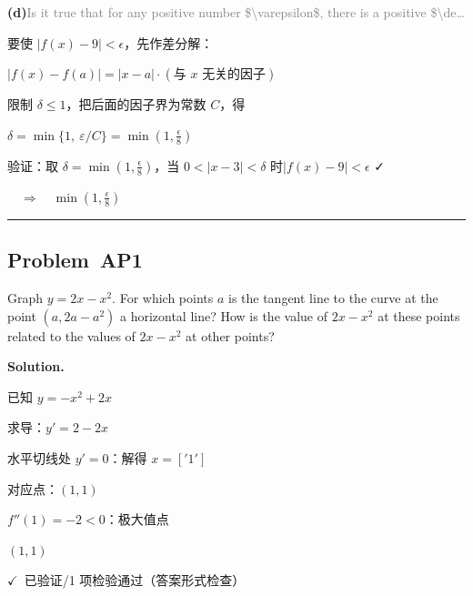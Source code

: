 \documentclass[12pt, a4paper]{article}
\newcommand{\problem}[1]{\subsection*{Problem~#1}}
\newcommand{\solution}{%
  \par\noindent
  {\color{solutiongreen}\bfseries Solution.}\par
}
\newcommand{\verifyok}{\textcolor{solutiongreen}{\ensuremath{\checkmark}\ 已验证}}
\begin{document}
\textbf{(d)}\quad \textcolor{gray}{\small Is it true that for any positive number \$\textbackslash{}varepsilon\$, there is a positive \$\textbackslash{}de…}

要使 $|f(x) - 9| < \epsilon$，先作差分解：

$|f(x)-f(a)| = |x-a|\cdot(\text{与 }x\text{ 无关的因子})$

限制 $\delta\le 1$，把后面的因子界为常数 $C$，得

$\delta = \min\{1,\ \varepsilon/C\} = \min\left(1, \frac{\epsilon}{8}\right)$

验证：取 $\delta = \min\left(1, \frac{\epsilon}{8}\right)$，当 $0<|x - 3| < \delta$ 时$|f(x) - 9| < \epsilon$ ✓

$\quad\Rightarrow\quad \min\left(1, \frac{\epsilon}{8}\right)$


\vspace{0.8em}\hrule\vspace{0.8em}

\problem{AP1}

\begin{stepbox}
Graph $y = 2x - x^2$. For which points $a$ is the tangent line to the curve at the point $(a, 2a - a^2)$ a horizontal line? How is the value of $2x - x^2$ at these points related to the values of $2x - x^2$ at other points?
\end{stepbox}

\solution

\begin{stepbox}
已知 $y = - x^{2} + 2 x$
\end{stepbox}

\begin{stepbox}
求导：$y' = 2 - 2 x$
\end{stepbox}

\begin{stepbox}
水平切线处 $y' = 0$：解得 $x = ['1']$
\end{stepbox}

\begin{stepbox}
对应点：$(1, 1)$
\end{stepbox}

\begin{stepbox}
$f''(1) = -2 < 0$：极大值点
\end{stepbox}

\begin{center}
$\boxed{(1, 1)}$
\end{center}

\begin{verifybox}\small \verifyok{}/1 项检验通过（答案形式检查） \end{verifybox}
\end{document}
